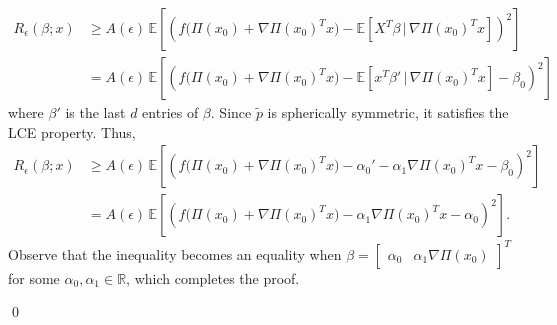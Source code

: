 \documentclass[11pt]{article}
\begin{document}
\begin{align*}
    R_{\epsilon}(\beta; x) &\geq A( \epsilon)\,\mathbb{E}\left[\left(f\Big(\Pi(x_0) + \nabla\Pi(x_0)^{T}x\Big)-\mathbb{E}\left[X^{T}\beta \, \Big| 
    \, \nabla\Pi(x_0)^{T}x\right]\right)^2\right] \\
    &= A( \epsilon)\,\mathbb{E}\left[\left(f\Big(\Pi(x_0) + \nabla\Pi(x_0)^{T}x\Big)-\mathbb{E}\left[x^{T}\beta' \, \Big| 
    \, \nabla\Pi(x_0)^{T}x\right]- \beta_0\right)^2\right]
\end{align*}
where $\beta'$ is the last $d$ entries of $\beta$.  Since $\tilde{p}$ is spherically symmetric, it satisfies the LCE property. Thus,
\begin{align}
    R_{\epsilon}(\beta; x) &\geq A( \epsilon)\,\mathbb{E}\left[\left(f\Big(\Pi(x_0) + \nabla\Pi(x_0)^{T}x\Big)-\alpha_0' - \alpha_1\nabla\Pi(x_0)^{T}x - \beta_0\right)^2\right] \\
    &=  A( \epsilon)\,\mathbb{E}\left[\left(f\Big(\Pi(x_0) + \nabla\Pi(x_0)^{T}x\Big) - \alpha_1\nabla\Pi(x_0)^{T}x - \alpha_0\right)^2\right]. \label{eq: surrogate risk lower bound}
\end{align}
Observe that the inequality becomes an equality when $\beta = \begin{bmatrix}\alpha_0  & \alpha_1\nabla \Pi(x_0) \end{bmatrix}^T$ for some $\alpha_0, \alpha_1 \in \mathbb{R}$, which completes the proof.

\qed{}
\end{document}
